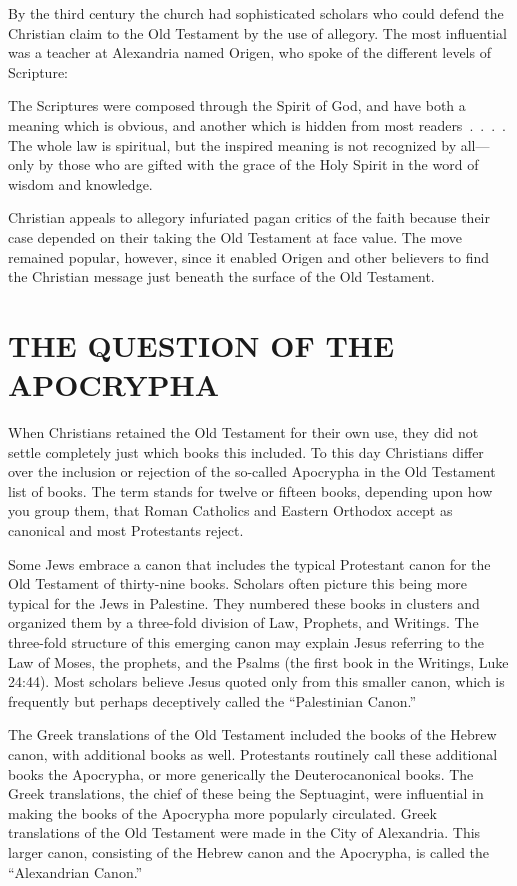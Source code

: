 By the third century the church had sophisticated scholars who could defend the Christian claim to
the Old Testament by the use of allegory. The most influential was a teacher at Alexandria named
Origen, who spoke of the different levels of Scripture:

\begin{blockquote}
The Scriptures were composed through the Spirit of God, and have both a meaning which is obvious,
and another which is hidden from most readers~.~.~.~. The whole law is spiritual, but the inspired
meaning is not recognized by all—only by those who are gifted with the grace of the Holy Spirit in
the word of wisdom and knowledge.
\end{blockquote}

Christian appeals to allegory infuriated pagan critics of the faith because their case depended on
their taking the Old Testament at face value. The move remained popular, however, since it enabled
Origen and other believers to find the Christian message just beneath the surface of the Old
Testament.

\section{THE QUESTION OF THE APOCRYPHA}

When Christians retained the Old Testament for their own use, they did not settle completely just
which books this included. To this day Christians differ over the inclusion or rejection of the
so-called Apocrypha in the Old Testament list of books. The term stands for twelve or fifteen books,
depending upon how you group them, that Roman Catholics and Eastern Orthodox accept as canonical and
most Protestants reject.

Some Jews embrace a canon that includes the typical Protestant canon for the Old Testament of
thirty-nine books. Scholars often picture this being more typical for the Jews in Palestine. They
numbered these books in clusters and organized them by a three-fold division of Law, Prophets, and
Writings. The three-fold structure of this emerging canon may explain Jesus referring to the Law of
Moses, the prophets, and the Psalms (the first book in the Writings, Luke 24:44). Most scholars
believe Jesus quoted only from this smaller canon, which is frequently but perhaps deceptively
called the “Palestinian Canon.”

The Greek translations of the Old Testament included the books of the Hebrew canon, with additional
books as well. Protestants routinely call these additional books the Apocrypha, or more generically
the Deuterocanonical books. The Greek translations, the chief of these being the Septuagint, were
influential in making the books of the Apocrypha more popularly circulated. Greek translations of
the Old Testament were made in the City of Alexandria. This larger canon, consisting of the Hebrew
canon and the Apocrypha, is called the “Alexandrian Canon.”

